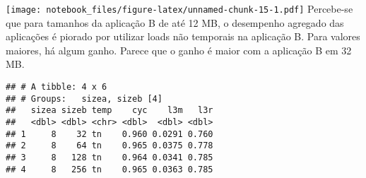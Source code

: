 \documentclass[
]{article}
\newenvironment{Shaded}{\begin{snugshade}}{\end{snugshade}}
\newcommand{\CommentTok}[1]{\textcolor[rgb]{0.56,0.35,0.01}{\textit{#1}}}
\newcommand{\DataTypeTok}[1]{\textcolor[rgb]{0.13,0.29,0.53}{#1}}
\newcommand{\DecValTok}[1]{\textcolor[rgb]{0.00,0.00,0.81}{#1}}
\newcommand{\KeywordTok}[1]{\textcolor[rgb]{0.13,0.29,0.53}{\textbf{#1}}}
\newcommand{\NormalTok}[1]{#1}
\newcommand{\OperatorTok}[1]{\textcolor[rgb]{0.81,0.36,0.00}{\textbf{#1}}}
\newcommand{\StringTok}[1]{\textcolor[rgb]{0.31,0.60,0.02}{#1}}
\begin{document}
\begin{Shaded}
\end{Shaded}

\texttt{[image: notebook\_files/figure-latex/unnamed-chunk-15-1.pdf]}
Percebe-se que para tamanhos da aplicação B de até 12 MB, o desempenho
agregado das aplicações é piorado por utilizar loads não temporais na
aplicação B. Para valores maiores, há algum ganho. Parece que o ganho é
maior com a aplicação B em 32 MB.

\begin{Shaded}
\end{Shaded}

\begin{verbatim}
## # A tibble: 4 x 6
## # Groups:   sizea, sizeb [4]
##   sizea sizeb temp    cyc    l3m   l3r
##   <dbl> <dbl> <chr> <dbl>  <dbl> <dbl>
## 1     8    32 tn    0.960 0.0291 0.760
## 2     8    64 tn    0.965 0.0375 0.778
## 3     8   128 tn    0.964 0.0341 0.785
## 4     8   256 tn    0.965 0.0363 0.785
\end{verbatim}
\end{document}
